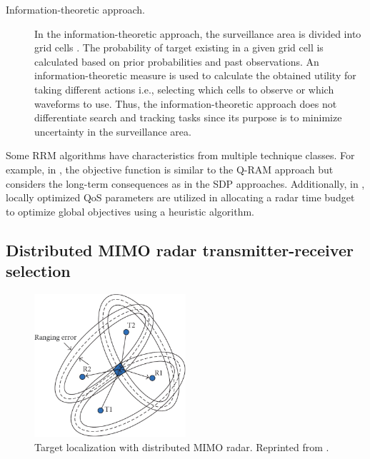 \documentclass[english, 12pt, a4paper, elec, utf8, a-1b, online]{aaltothesis}
\begin{document}
\begin{description}
\item[Information-theoretic approach.]

In the information-theoretic approach, the surveillance area is divided into grid cells \cite{Kastella1997, Kreucher2004, Kreucher2005, Xu2010}.
The probability of target existing in a given grid cell is calculated based on prior probabilities and past observations.
An information-theoretic measure is used to calculate the obtained utility for taking different actions i.e., selecting which cells to observe or which waveforms to use.
Thus, the information-theoretic approach does not differentiate search and tracking tasks since its purpose is to minimize uncertainty in the surveillance area.

\end{description}


\noindent
Some RRM algorithms have characteristics from multiple technique classes. 
For example, in \cite{Byrne2015, Byrne2016}, the objective function is similar to the Q-RAM approach but considers the long-term consequences as in the SDP approaches.
Additionally, in \cite{Esfahani2012}, locally optimized QoS parameters are utilized in allocating a radar time budget to optimize global objectives using a heuristic algorithm.

\subsection{Distributed MIMO radar transmitter-receiver selection}\label{sec:TX_RX_selection_review}

\begin{figure}[b]
    \centering
    \includegraphics[width=0.5\textwidth]{figures/background/MIMO_TX_RX_selection.png}
    \caption{Target localization with distributed MIMO radar. Reprinted from \cite{Sun2014}.}
    \label{fig:dist_MIMO_localization}
\end{figure}
\end{document}
